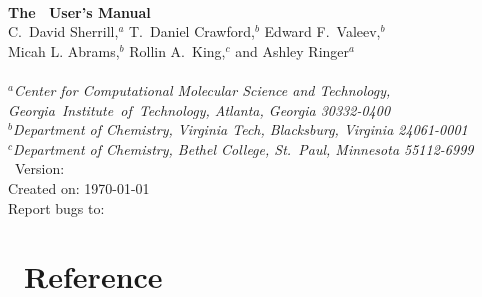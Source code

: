 \documentclass[12pt]{article}
\begin{document}


\begin{center}
\ \\
\vspace{2.0in}
{\bf {\Large The \PSIthree\ User's Manual}} \\
\vspace{0.5in}
C.~David Sherrill,$^a$ T.~Daniel Crawford,$^b$ Edward F.~Valeev,$^b$ \\
Micah L. Abrams,$^b$ Rollin A.~King,$^c$ and Ashley Ringer$^a$ \\
\ \\
{\em $^a$Center for Computational Molecular Science and Technology, 
  \mbox{Georgia Institute of Technology,} Atlanta, Georgia 30332-0400} \\
\vspace{0.1in}
{\em $^b$Department of Chemistry, Virginia Tech, Blacksburg, Virginia 
  24061-0001} \\
\vspace{0.1in}
{\em $^c$Department of Chemistry, Bethel College, St.\ Paul, Minnesota 
  55112-6999}
\ \\
\vspace{0.3in}
\PSIthree\ Version: \PSIversion \\
Created on: \today \\
Report bugs to: \PSIemail \\
\end{center}

\thispagestyle{empty}

\newpage
\tableofcontents
\newpage





  
  
  
  
  




\appendix
\section{\PSIthree\ Reference}\label{PSI_Reference}


%



\end{document}
